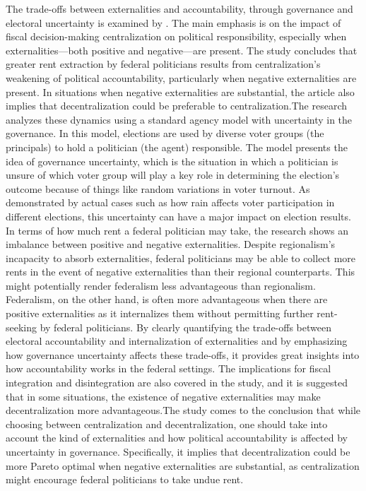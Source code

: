 The trade-offs between externalities and accountability, through governance and electoral uncertainty is examined by  . The main emphasis is on the impact of fiscal decision-making centralization on political responsibility, especially when externalities—both positive and negative—are present. The study concludes that greater rent extraction by federal politicians results from centralization's weakening of political accountability, particularly when negative externalities are present. In situations when negative externalities are substantial, the article also implies that decentralization could be preferable to centralization.The research analyzes these dynamics using a standard agency model with uncertainty in the governance. In this model, elections are used by diverse voter groups (the principals) to hold a politician (the agent) responsible. The model presents the idea of governance uncertainty, which is the situation in which a politician is unsure of which voter group will play a key role in determining the election's outcome because of things like random variations in voter turnout. As demonstrated by actual cases such as how rain affects voter participation in different elections, this uncertainty can have a major impact on election results. In terms of how much rent a federal politician may take, the research shows an imbalance between positive and negative externalities. Despite regionalism's incapacity to absorb externalities, federal politicians may be able to collect more rents in the event of negative externalities than their regional counterparts. This might potentially render federalism less advantageous than regionalism. Federalism, on the other hand, is often more advantageous when there are positive externalities as it internalizes them without permitting further rent-seeking by federal politicians. By clearly quantifying the trade-offs between electoral accountability and internalization of externalities and by emphasizing how governance uncertainty affects these trade-offs, it provides great insights into how accountability works in the federal settings. The implications for fiscal integration and disintegration are also covered in the study, and it is suggested that in some situations, the existence of negative externalities may make decentralization more advantageous.The study comes to the conclusion that while choosing between centralization and decentralization, one should take into account the kind of externalities and how political accountability is affected by uncertainty in governance. Specifically, it implies that decentralization could be more Pareto optimal when negative externalities are substantial, as centralization might encourage federal politicians to take undue rent.\par
